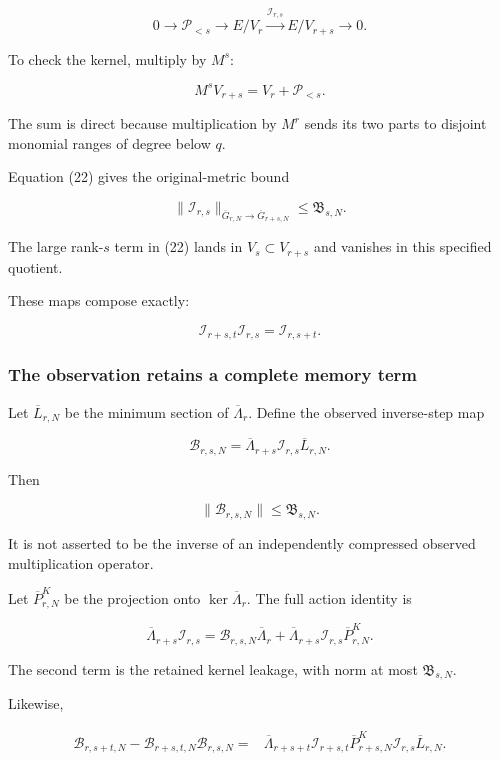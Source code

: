 \documentclass[11pt]{article}
\begin{document}
\[
\boxed{
0\longrightarrow\mathcal P_{<s}
\longrightarrow E/V_r
\xrightarrow{\mathcal I_{r,s}}E/V_{r+s}
\longrightarrow0.
}
\tag{25}
\]

To check the kernel, multiply by \(M^s\):

\[
M^sV_{r+s}=V_r+\mathcal P_{<s}.
\]

The sum is direct because multiplication by \(M^r\) sends its two parts to disjoint monomial ranges of degree below \(q\).

Equation (22) gives the original-metric bound

\[
\boxed{
\|\mathcal I_{r,s}\|_{\overline G_{r,N}\to\overline G_{r+s,N}}
\le\mathfrak B_{s,N}.
}
\tag{26}
\]

The large rank-\(s\) term in (22) lands in \(V_s\subset V_{r+s}\) and vanishes in this specified quotient.

These maps compose exactly:

\[
\mathcal I_{r+s,t}\mathcal I_{r,s}
=
\mathcal I_{r,s+t}.
\tag{27}
\]

\subsubsection{The observation retains a complete memory term}\label{the-observation-retains-a-complete-memory-term}

Let \(\overline L_{r,N}\) be the minimum section of \(\overline\Lambda_r\). Define the observed inverse-step map

\[
\mathcal B_{r,s,N}
=
\overline\Lambda_{r+s}
\mathcal I_{r,s}\overline L_{r,N}.
\]

Then

\[
\boxed{\|\mathcal B_{r,s,N}\|\le\mathfrak B_{s,N}.}
\tag{28}
\]

It is not asserted to be the inverse of an independently compressed observed multiplication operator.

Let \(\overline P^K_{r,N}\) be the projection onto \(\ker\overline\Lambda_r\). The full action identity is

\[
\boxed{
\overline\Lambda_{r+s}\mathcal I_{r,s}
=
\mathcal B_{r,s,N}\overline\Lambda_r
+
\overline\Lambda_{r+s}\mathcal I_{r,s}\overline P^K_{r,N}.
}
\tag{29}
\]

The second term is the retained kernel leakage, with norm at most \(\mathfrak B_{s,N}\).

Likewise,

\[
\boxed{
\begin{aligned}
\mathcal B_{r,s+t,N}
-\mathcal B_{r+s,t,N}\mathcal B_{r,s,N}
={}&
\overline\Lambda_{r+s+t}\mathcal I_{r+s,t}
\overline P^K_{r+s,N}
\mathcal I_{r,s}\overline L_{r,N}.
\end{aligned}
}
\tag{30}
\]
\end{document}

